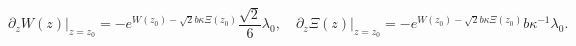 \begin{equation}
\partial_z W(z) \vert_{z=z_0}=-e^{W(z_0)-\sqrt{2}b \kappa \Xi(z_0)} 
\frac{\sqrt{2}}{6} \lambda_0,\quad 
\partial_z \Xi(z) \vert_{z=z_0}=-  e^{W(z_0)-\sqrt{2}b \kappa \Xi(z_0)}
b \kappa^{-1} \lambda_0.
\end{equation}

